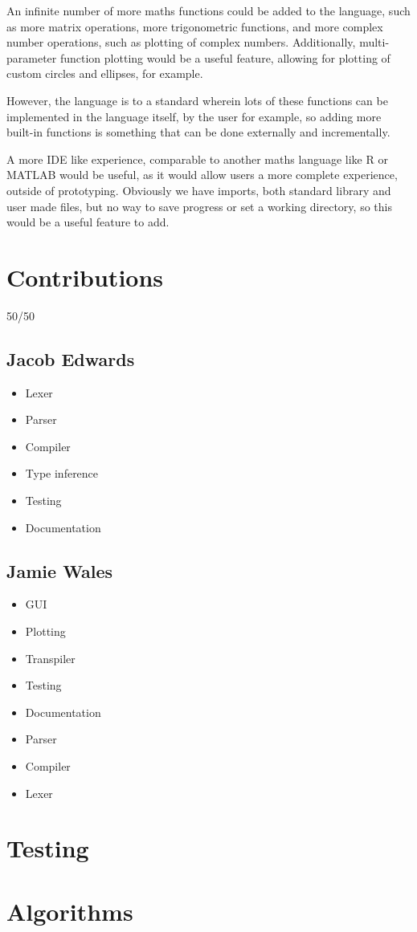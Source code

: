 \documentclass[a4paper, oneside, 11pt]{report}
\begin{document}
An infinite number of more maths functions could be added to the language, such as more matrix operations, more
trigonometric functions, and more complex number operations, such as plotting of complex numbers.
Additionally, multi-parameter function plotting would be a useful feature, allowing for plotting of custom circles and
ellipses, for example.

However, the language is to a standard wherein lots of these functions can be implemented in the language itself, by 
the user for example, so adding more built-in functions is something that can be done externally and incrementally.

A more IDE like experience, comparable to another maths language like R or MATLAB would be useful, as it would allow 
users a more complete experience, outside of prototyping.
Obviously we have imports, both standard library and user made files, but no way to save progress or set a working 
directory, so this would be a useful feature to add.






\appendix
\chapter{Contributions}\label{ch:contributions}

50/50

\section{Jacob Edwards}\label{sec:jacob-edwards}

\begin{itemize}
    \item Lexer
    \item Parser
    \item Compiler
    \item Type inference
    \item Testing
    \item Documentation
\end{itemize}

\section{Jamie Wales}\label{sec:jamie-wales}

\begin{itemize}
    \item GUI
    \item Plotting
    \item Transpiler
    \item Testing
    \item Documentation
    \item Parser
    \item Compiler
    \item Lexer
\end{itemize}

\chapter{Testing}\label{ch:test}



\chapter{Algorithms}\label{ch:algorithms}


\end{document}
